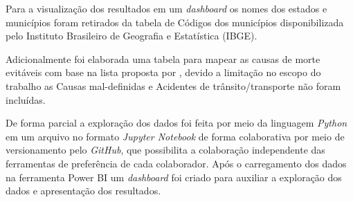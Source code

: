 Para a visualização dos resultados em um \textit{dashboard} os nomes dos estados e municípios foram retirados da tabela de Códigos dos municípios disponibilizada pelo Instituto Brasileiro de Geografia e Estatística (IBGE).

Adicionalmente foi elaborada uma tabela para mapear as causas de morte evitáveis com base na lista proposta por , devido a limitação no escopo do trabalho as Causas mal-definidas e Acidentes de trânsito/transporte não foram incluídas.

De forma parcial a exploração dos dados foi feita por meio da linguagem \textit{Python} em um arquivo no formato \textit{Jupyter Notebook} de forma colaborativa por meio de versionamento pelo \textit{GitHub}, que possibilita a colaboração independente das ferramentas de preferência de cada colaborador. Após o carregamento dos dados na ferramenta Power BI um \textit{dashboard} foi criado para auxiliar a exploração dos dados e apresentação dos resultados.

